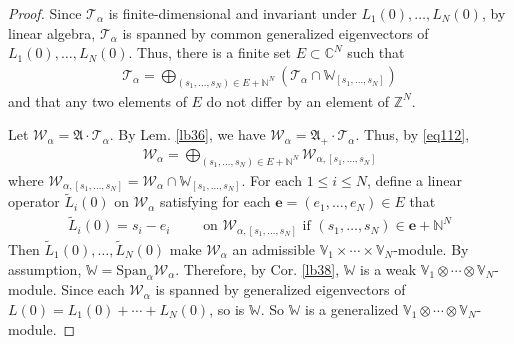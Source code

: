 \documentclass[11pt,b5paper,notitlepage]{article}
\theoremstyle{definition}
\theoremstyle{plain}
\newcommand{\fk}{\mathfrak}
\newcommand{\mc}{\mathcal}
\newcommand{\wtd}{\widetilde}
\newcommand{\Span}{\mathrm{Span}}
\newcommand{\mbf}{\mathbf}
\newcommand{\Vbb}{\mathbb V}
\newcommand{\Wbb}{\mathbb W}
\newcommand{\Cbb}{\mathbb C}
\newcommand{\Nbb}{\mathbb N}
\newcommand{\Zbb}{\mathbb Z}
\newcommand{\<}{\left\langle}
\renewcommand{\>}{\right\rangle}
\numberwithin{equation}{subsection}
\begin{document}
\begin{proof}








Since $\mc T_\alpha$ is finite-dimensional and  invariant under $L_1(0),\dots,L_N(0)$, by linear algebra, $\mc T_\alpha$ is spanned by common generalized eigenvectors of $L_1(0),\dots,L_N(0)$. Thus, there is a finite set $E\subset\Cbb^N$ such that 
\begin{align*}
\mc T_\alpha=\bigoplus_{(s_1,\dots,s_N)\in E+\Nbb^N} (\mc T_\alpha\cap\Wbb_{[s_1,\dots,s_N]})
\end{align*}
and that any two elements of $E$ do not differ by an element of $\Zbb^N$.



Let $\mc W_\alpha=\fk A\cdot \mc T_\alpha$. By Lem. \ref{lb36}, we have $\mc W_\alpha=\fk A_+\cdot\mc T_\alpha$. Thus, by \eqref{eq112},
\begin{align*}
\mc W_\alpha=\bigoplus_{(s_1,\dots,s_N)\in E+\Nbb^N} \mc W_{\alpha,[s_1,\dots,s_N]}
\end{align*}
where $\mc W_{\alpha,[s_1,\dots,s_N]}=\mc W_\alpha\cap\Wbb_{[s_1,\dots,s_N]}$. For each $1\leq i\leq N$, define a linear operator $\wtd L_i(0)$ on $\mc W_\alpha$ satisfying for each $\mbf e=(e_1,\dots,e_N)\in E$ that
\begin{align*}
\wtd L_i(0)=s_i-e_i \qquad\text{ on }\mc W_{\alpha,[s_1,\dots,s_N]}\text{ if } (s_1,\dots,s_N)\in\mbf e+\Nbb^N
\end{align*} 
Then $\wtd L_1(0),\dots,\wtd L_N(0)$ make $\mc W_\alpha$ an admissible $\Vbb_1\times\cdots\times\Vbb_N$-module. By assumption, $\Wbb=\Span_\alpha\mc W_\alpha$. Therefore, by Cor.  \ref{lb38}, $\Wbb$ is a weak $\Vbb_1\otimes\cdots\otimes\Vbb_N$-module. Since each $\mc W_\alpha$ is spanned by generalized eigenvectors of $L(0)=L_1(0)+\cdots+L_N(0)$, so is $\Wbb$. So $\Wbb$ is a generalized $\Vbb_1\otimes\cdots\otimes\Vbb_N$-module.
\end{proof}
\end{document}
